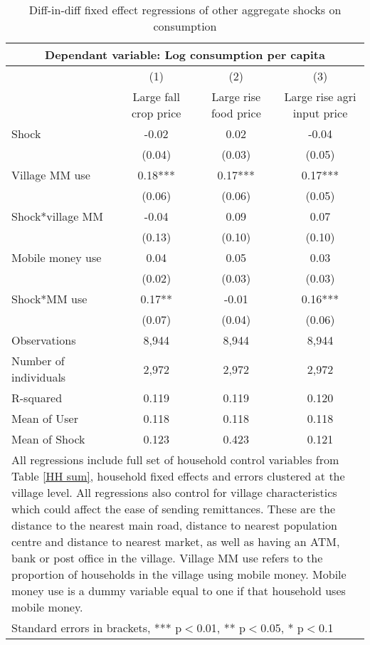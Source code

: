 \begin{table}
\centering \caption{Diff-in-diff fixed effect regressions of other aggregate shocks on consumption} \label{other shocks}
\begin{tabular}{lccc} 
\multicolumn{4}{c}{Dependant variable: Log consumption per capita}\\ \hline
 & (1) & (2) & (3) \\
 & Large fall crop price & Large rise food price & Large rise agri input price \\ \hline
Shock & -0.02 & 0.02  & -0.04  \\
 & (0.04) & (0.03)  & (0.05)  \\
Village MM use & 0.18*** & 0.17*** & 0.17*** \\
 & (0.06) & (0.06) & (0.05) \\
Shock*village MM & -0.04 & 0.09   & 0.07   \\
 & (0.13)  & (0.10)  & (0.10) \\
Mobile money use & 0.04 & 0.05 & 0.03 \\
 & (0.02) & (0.03) & (0.03) \\
Shock*MM use & 0.17** & -0.01  & 0.16***
  \\
 & (0.07) & (0.04)  & (0.06) \\

Observations & 8,944 & 8,944 & 8,944 \\
Number of individuals & 2,972 & 2,972 & 2,972 \\
R-squared & 0.119 & 0.119 & 0.120 \\
  \hline
Mean of User & 0.118 & 0.118 & 0.118 \\
 Mean of Shock & 0.123 & 0.423 & 0.121 \\ \hline
\multicolumn{4}{p{14cm}}{ All regressions include full set of household control variables from Table \ref{HH sum}, household fixed effects and errors clustered at the village level. All regressions also control for village characteristics which could affect the ease of sending remittances. These are the distance to the nearest main road, distance to nearest population centre and distance to nearest market, as well as having an ATM, bank or post office in the village. Village MM use refers to the proportion of households in the village using mobile money. Mobile money use is a dummy variable equal to one if that household uses mobile money. } \\
\multicolumn{4}{l}{ Standard errors in brackets, *** p$<$0.01, ** p$<$0.05, * p$<$0.1} \\
\end{tabular}
\end{table}
